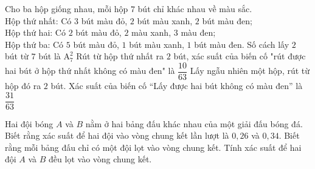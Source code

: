 \begin{vd}%
	Cho ba hộp giống nhau, mỗi hộp $7$ bút chỉ khác nhau về màu sắc.\\
	Hộp thứ nhất: Có $3$ bút màu đỏ, $2$ bút màu xanh, $2$ bút màu đen;\\
	Hộp thứ hai: Có $2$ bút màu đỏ, $2$ màu xanh, $3$ màu đen;\\
	Hộp thứ ba: Có $5$ bút màu đỏ, $1$ bút màu xanh, $1$ bút màu đen.
	{Số cách lấy $2$ bút từ $7$ bút là $\mathrm{A}_7^2$}
	{Rút từ hộp thứ nhất ra $2$ bút, xác suất của biến cố "rút được hai bút ở hộp thứ nhất không có màu đen" là $\dfrac{10}{63}$}
	{\True Lấy ngẫu nhiên một hộp, rút từ hộp đó ra $2$ bút. Xác suất của biến cố “Lấy được hai bút không có màu đen” là $\dfrac{31}{63}$}
\end{vd}

\begin{bt}%
	Hai đội bóng $A$ và $B$ nằm ở hai bảng đấu khác nhau của một giải đấu bóng đá. Biết rằng xác suất để hai đội vào vòng chung kết lần lượt là $0{,}26$ và $0{,}34$. Biết rằng mỗi bảng đấu chỉ có một đội lọt vào vòng chung kết. Tính xác suất để hai đội $A$ và $B$ đều lọt vào vòng chung kết.
\end{bt}

